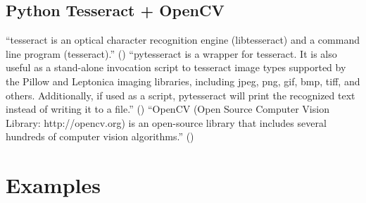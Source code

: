 \documentclass[10pt, letterpaper, twoside]{article}
\begin{document}
\subsection{Python Tesseract + OpenCV}\label{sec:pytesseract_opencv}
\enquote{\Gls{tesseract} is an optical character recognition engine (libtesseract) and a command line program (tesseract).} (\cite{tesseract}) \enquote{\Gls{pytesseract} is a wrapper for \Gls{tesseract}. It is also useful as a stand-alone invocation script to \Gls{tesseract} image types supported by the Pillow and Leptonica imaging libraries, including jpeg, png, gif, bmp, tiff, and others. Additionally, if used as a script, \Gls{pytesseract} will print the recognized text instead of writing it to a file.} (\cite{pytesseract}) \enquote{OpenCV (Open Source Computer Vision Library: http://opencv.org) is an open-source library that includes several hundreds of computer vision algorithms.} (\cite{opencv})
\section{Examples}\label{sec:examples}
\end{document}
